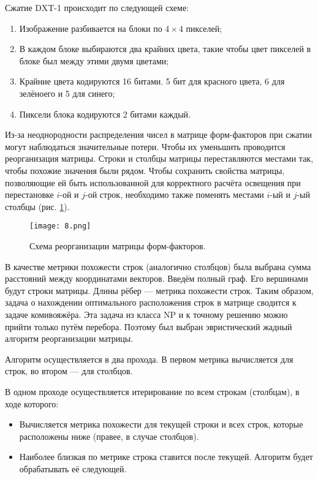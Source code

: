 \documentclass[12pt,fleqn]{article}
\begin{document}
Сжатие DXT-1 происходит по следующей схеме:

\begin{enumerate}

\item Изображение разбивается на блоки по $4\times4$ пикселей;

\item В каждом блоке выбираются два крайних цвета, такие чтобы цвет пикселей в блоке был между этими двумя цветами;

\item Крайние цвета кодируются 16 битами. 5 бит для красного цвета, 6 для зелёноего и 5 для синего;

\item Пиксели блока кодируются 2 битами каждый.

\end{enumerate}

Из-за неоднородности распределения чисел в матрице форм-факторов при сжатии могут наблюдаться значительные потери. Чтобы их уменьшить проводится реорганизация матрицы. Строки и столбцы матрицы переставляются местами так, чтобы похожие значения были рядом. Чтобы сохранить свойства матрицы, позволяющие ей быть использованной для корректного расчёта освещения при перестановке $i$-ой и $j$-ой строк, необходимо также поменять местами $i$-ый и $j$-ый столбцы (рис. \ref{reorder_scheme}).

\begin{figure}[htb]
    \centering
    \texttt{[image: 8.png]}
    \caption{Схема реорганизации матрицы форм-факторов.}
    \label{reorder_scheme}
\end{figure}

В качестве метрики похожести строк (аналогично столбцов) была выбрана сумма расстояний между координатами векторов. Введём полный граф. Его вершинами будут строки матрицы. Длины рёбер --- метрика похожести строк. Таким образом, задача о нахождении оптимального расположения строк в матрице сводится к задаче комивояжёра. Эта задача из класса NP и к точному решению можно прийти только путём перебора. Поэтому был выбран эвристический жадный алгоритм реорганизации матрицы.

Алгоритм осуществляется в два прохода. В первом метрика вычисляется для строк, во втором --- для столбцов.

В одном проходе осуществляется итерирование по всем строкам (столбцам), в ходе которого:

\begin{itemize}

\item Вычисляется метрика похожести для текущей строки и всех строк, которые расположены ниже (правее, в случае столбцов).

\item Наиболее близкая по метрике строка ставится после текущей. Алгоритм будет обрабатывать её следующей.

\end{itemize}
\end{document}
